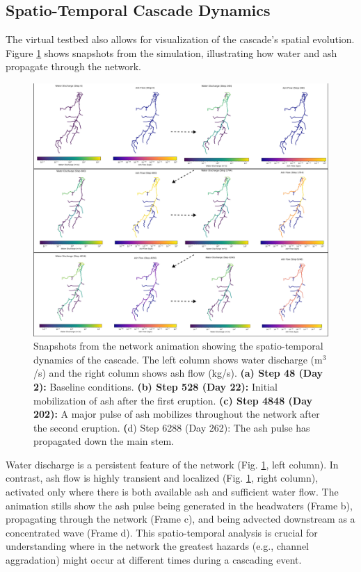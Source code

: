 \documentclass[12pt, a4paper]{article}
\begin{document}
\subsection{Spatio-Temporal Cascade Dynamics}
The virtual testbed also allows for visualization of the cascade's spatial evolution. Figure \ref{fig:animation} shows snapshots from the simulation, illustrating how water and ash propagate through the network.


\begin{figure}[H]
    \centering
    \includegraphics[width=1\linewidth]{animation.png}
    \caption{Snapshots from the network animation showing the spatio-temporal dynamics of the cascade. The left column shows water discharge (m$^3$/s) and the right column shows ash flow (kg/s). \textbf{(a) Step 48 (Day 2):} Baseline conditions. \textbf{(b) Step 528 (Day 22):} Initial mobilization of ash after the first eruption. \textbf{(c) Step 4848 (Day 202):} A major pulse of ash mobilizes throughout the network after the second eruption. \textbf(d) Step 6288 (Day 262): The ash pulse has propagated down the main stem.}
    \label{fig:animation}
\end{figure}


Water discharge is a persistent feature of the network (Fig. \ref{fig:animation}, left column). In contrast, ash flow is highly transient and localized (Fig. \ref{fig:animation}, right column), activated only where there is both available ash and sufficient water flow. The animation stills show the ash pulse being generated in the headwaters (Frame b), propagating through the network (Frame c), and being advected downstream as a concentrated wave (Frame d). This spatio-temporal analysis is crucial for understanding where in the network the greatest hazards (e.g., channel aggradation) might occur at different times during a cascading event.
\end{document}
